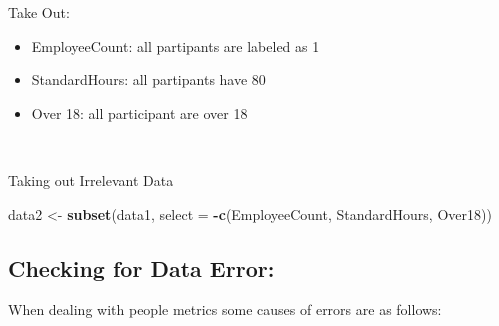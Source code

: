 \documentclass[
]{article}
\newenvironment{Shaded}{\begin{snugshade}}{\end{snugshade}}
\newcommand{\DataTypeTok}[1]{\textcolor[rgb]{0.13,0.29,0.53}{#1}}
\newcommand{\KeywordTok}[1]{\textcolor[rgb]{0.13,0.29,0.53}{\textbf{#1}}}
\newcommand{\NormalTok}[1]{#1}
\newcommand{\OperatorTok}[1]{\textcolor[rgb]{0.81,0.36,0.00}{\textbf{#1}}}
\newcommand{\StringTok}[1]{\textcolor[rgb]{0.31,0.60,0.02}{#1}}
\providecommand{\tightlist}{%
  \setlength{\itemsep}{0pt}\setlength{\parskip}{0pt}}
\begin{document}
Take Out:

\begin{itemize}
\tightlist
\item
  EmployeeCount: all partipants are labeled as 1
\item
  StandardHours: all partipants have 80
\item
  Over 18: all participant are over 18
\end{itemize}

~ ~

Taking out Irrelevant Data

\begin{Shaded}
\begin{Highlighting}[]
\NormalTok{data2 <-}\StringTok{ }\KeywordTok{subset}\NormalTok{(data1, }\DataTypeTok{select =} \OperatorTok{-}\KeywordTok{c}\NormalTok{(EmployeeCount, StandardHours, Over18))}
\end{Highlighting}
\end{Shaded}

\hypertarget{checking-for-data-error}{%
\subsection{Checking for Data Error:}\label{checking-for-data-error}}

When dealing with people metrics some causes of errors are as follows:
\end{document}
